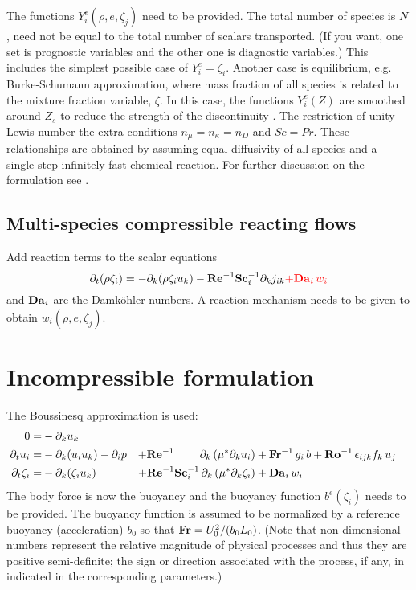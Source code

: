 The functions $Y_i^e(\rho,e,\zeta_j)$ need to be provided. The total number of species is $N$, need not be equal to the total number of scalars transported. (If you want, one set is prognostic variables and the other one is diagnostic variables.) This includes the simplest possible case of $Y_i^e = \zeta_i$. Another case is equilibrium, e.g. Burke-Schumann approximation, where mass fraction of all species is related to the mixture fraction variable, $\zeta$.  In this case, the functions $Y_i^e(Z)$ are smoothed around $Z_s$ to reduce the strength of the discontinuity \citep{Higuera:1994}. The restriction of unity Lewis number the extra conditions $n_\mu=n_\kappa=n_D$ and $Sc=Pr$. These relationships are obtained by assuming equal diffusivity of all species and a single-step infinitely fast chemical reaction.  For further discussion on the formulation see \cite{Williams:1985}.

\subsection{Multi-species compressible reacting flows}

Add reaction terms to the scalar equations
\begin{equation}
  \partial_t (\rho \zeta_i)= -\partial_k (\rho \zeta_i u_k)
  - \mathrm{\bf Re}^{-1}\mathrm{\bf Sc}_i^{-1} \partial_k j_{ik} \color{red}{+\mathrm{\bf Da}_i\,w_i}
\end{equation}
and $\mathrm{\bf Da}_i$ are the Damk{\"o}hler numbers. A reaction mechanism needs to be given to obtain $w_i(\rho,e,\zeta_j)$.

\section{Incompressible formulation}

The Boussinesq approximation is used:
\begin{subequations}
  \begin{align}
    0                   =& -\partial_k u_k                                          \\
    \partial_t  u_i     =& -\partial_k ( u_i u_k )-\partial_i p                     &
    +\mathrm{\bf Re}^{-1}\qquad\;\partial_k \left( \mu^{*} \partial_k u_i\right)  &
    +\mathrm{\bf Fr}^{-1}\, g_i\,b +\mathrm{\bf Ro}^{-1}\,\epsilon_{ijk} f_k\,u_j  \\
    \partial_t \zeta_i  =& -\partial_k (\zeta_i u_k)                                &
    +\mathrm{\bf Re}^{-1}\mathrm{\bf Sc}_i^{-1}\, \partial_k \left( \mu^{*}\partial_k\zeta_i\right) &+ \mathrm{\bf Da}_i\,w_i
  \end{align}
\end{subequations}
The body force is now the buoyancy and the buoyancy function $b^e(\zeta_i)$ needs to be provided. The buoyancy function is assumed to be normalized by a reference buoyancy (acceleration) $b_0$ so that $\mathrm{\bf Fr}=U_0^2/(b_0L_0)$. (Note that non-dimensional numbers represent the relative magnitude of physical processes and thus they are positive semi-definite; the sign or direction associated with the process, if any, in indicated in the corresponding parameters.)


